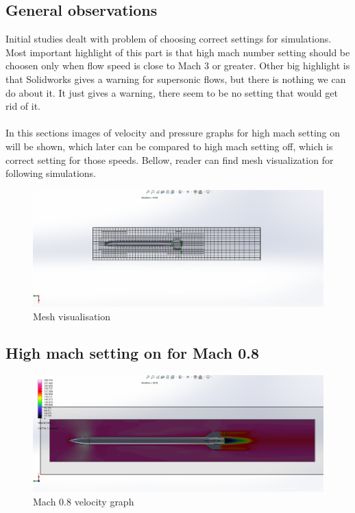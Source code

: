 \documentclass{article}
\begin{document}
\subsection{General observations}
Initial studies dealt with problem of choosing correct settings for simulations. Most important highlight of this part is that high mach number setting should be choosen only when flow speed is close to Mach 3 or greater. Other big highlight is that Solidworks gives a warning for supersonic flows, but there is nothing we can do about it. It just gives a warning, there seem to be no setting that would get rid of it.\\\\
In this sections images of velocity and pressure graphs for high mach setting on will be shown, which later can be compared to high mach setting off, which is correct setting for those speeds. Bellow, reader can find mesh visualization for following simulations.
\begin{figure}[H]
\centering
\includegraphics[width=\textwidth]{Mach1Mesh}
\caption{Mesh visualisation}
\label{fig:Mach1Mesh}
\end{figure}
\subsection{High mach setting on for Mach 0.8}
\begin{figure}[H]
\centering
\includegraphics[width=\textwidth]{Mach08Speed}
\caption{Mach 0.8 velocity graph}
\label{fig:Mach08Speed}
\end{figure}
\end{document}
